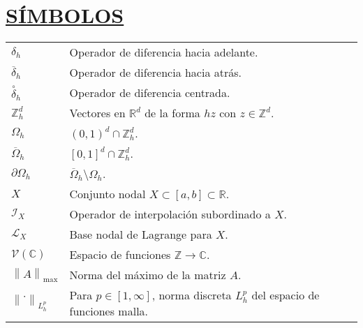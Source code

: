 \section*{\textbf{\underline{SÍMBOLOS}}}

\begin{tabular}{L{1.5 cm}p{12.5 cm}}
    $\delta_{h}$                            & Operador de diferencia hacia adelante.                                                       \\
    $\overline{\delta}_{h}$                 & Operador de diferencia hacia atrás.                                                          \\
    ${\overset{\circ}{\delta}}_{h}$         & Operador de diferencia centrada.                                                             \\
    $\mathbb{Z}^{d}_{h}$                    & Vectores en $\mathbb{R}^{d}$ de la forma $hz$ con $z\in\mathbb{Z}^{d}$.                      \\
    $\Omega_{h}$                            & ${\left(0,1\right)}^{d}\cap\mathbb{Z}^{d}_{h}$.                                              \\
    $\overline{\Omega}_{h}$                 & ${\left[0,1\right]}^{d}\cap\mathbb{Z}^{d}_{h}$.                                              \\
    $\partial\Omega_{h}$                    & $\overline{\Omega}_{h}\setminus\Omega_{h}$.                                                  \\
    $X$                                     & Conjunto nodal $X\subset\left[a,b\right]\subset\mathbb{R}$.                                  \\
    $\mathcal{I}_{X}$                       & Operador de interpolación subordinado a $X$.                                                 \\
    $\mathcal{L}_{X}$                       & Base nodal de Lagrange para $X$.                                                             \\
    $\mathcal{V}\left(\mathbb{C}\right)$    & Espacio de funciones $\mathbb{Z}\to\mathbb{C}$.                                              \\
    ${\left\|A\right\|}_{\max}$             & Norma del máximo de la matriz $A$.                                                           \\
    ${\left\|\cdot\right\|}_{L^{p}_{h}}$    & Para $p\in\left[1,\infty\right]$, norma discreta $L^{p}_{h}$ del espacio de funciones malla. \\

\end{tabular}
